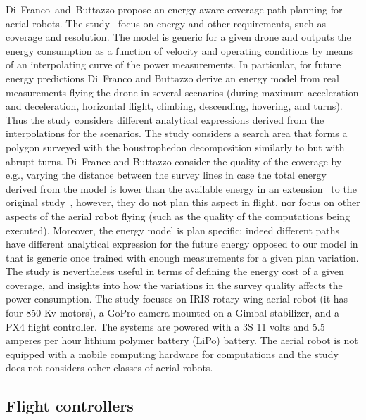 Di~Franco~and~Buttazzo propose an energy-aware coverage path planning for aerial robots. The study~\citep{difranco2015energy} focus on energy and other requirements, such as coverage and resolution.  The model is generic for a given drone and outputs the energy consumption as a function of velocity and operating conditions by means of an interpolating curve of the power measurements. In particular, for future energy predictions Di~Franco and Buttazzo derive an energy model from real measurements flying the drone in several scenarios (during maximum acceleration and deceleration, horizontal flight, climbing, descending, hovering, and turns). Thus the study considers different analytical expressions derived from the interpolations for the scenarios. The study considers a search area that forms a polygon surveyed with the boustrophedon decomposition similarly to  but with abrupt turns. Di~France and Buttazzo consider the quality of the coverage by e.g., varying the distance between the survey lines in case the total energy derived from the model is lower than the available energy in an extension~\citep{difranco2016coverage} to the original study~\citep{difranco2015energy}, however, they do not plan this aspect in flight, nor focus on other aspects of the aerial robot flying (such as the quality of the computations being executed). Moreover, the energy model is plan specific; indeed different paths have different analytical expression for the future energy opposed to our model in  that is generic once trained with enough measurements for a given plan variation. The study is nevertheless useful in terms of defining the energy cost of a given coverage, and insights into how the variations in the survey quality affects the power consumption. The study focuses on IRIS rotary wing aerial robot (it has four 850 Kv motors), a GoPro camera mounted on a Gimbal stabilizer, and a PX4 flight controller. The systems are powered with a 3S 11 volts and 5.5 amperes per hour  lithium polymer battery (LiPo) battery. The aerial robot is not equipped with a mobile computing hardware for computations and the study does not considers other classes of aerial robots. 


\subsection{\color{orange}Flight controllers}


